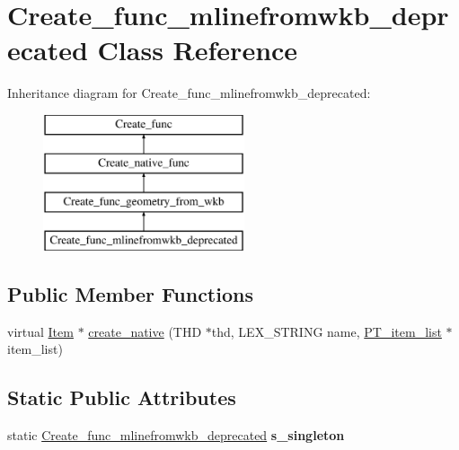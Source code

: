 \hypertarget{classCreate__func__mlinefromwkb__deprecated}{}\section{Create\+\_\+func\+\_\+mlinefromwkb\+\_\+deprecated Class Reference}
\label{classCreate__func__mlinefromwkb__deprecated}
Inheritance diagram for Create\+\_\+func\+\_\+mlinefromwkb\+\_\+deprecated\+:\begin{figure}[H]
\begin{center}
\leavevmode
\includegraphics[height=4.000000cm]{classCreate__func__mlinefromwkb__deprecated}
\end{center}
\end{figure}
\subsection*{Public Member Functions}
\begin{DoxyCompactItemize}
\item 
virtual \mbox{\hyperlink{classItem}{Item}} $\ast$ \mbox{\hyperlink{classCreate__func__mlinefromwkb__deprecated_afc7d5e74ffec6ebd48da9ae7e781cd51}{create\+\_\+native}} (T\+HD $\ast$thd, L\+E\+X\+\_\+\+S\+T\+R\+I\+NG name, \mbox{\hyperlink{classPT__item__list}{P\+T\+\_\+item\+\_\+list}} $\ast$item\+\_\+list)
\end{DoxyCompactItemize}
\subsection*{Static Public Attributes}
\begin{DoxyCompactItemize}
\item 
\mbox{\label{classCreate__func__mlinefromwkb__deprecated_a20e6b96bc69f27654bf06eb01f86b370}} 
static \mbox{\hyperlink{classCreate__func__mlinefromwkb__deprecated}{Create\+\_\+func\+\_\+mlinefromwkb\+\_\+deprecated}} {\bfseries s\+\_\+singleton}
\end{DoxyCompactItemize}
